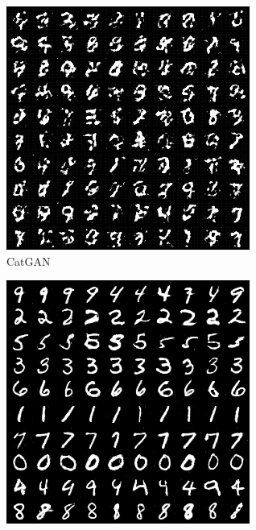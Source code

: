 \begin{figure}[htbp]
  \centering
  \begin{subfigure}[b]{\trif\textwidth}
    \includegraphics[width=\textwidth]{Img/cg.png}
    \caption{CatGAN}
    \label{ffig:m-cg}
  \end{subfigure}
  \begin{subfigure}[b]{\trif\textwidth}
    \includegraphics[width=\textwidth]{Img/icg.png}

\end{subfigure}
\end{figure}
